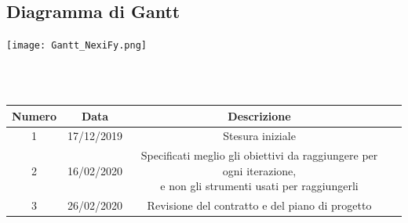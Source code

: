 \subsection{Diagramma di Gantt}
\vspace{0.5cm}
\begin{center}
	\hspace*{-2cm}\texttt{[image: Gantt\_NexiFy.png]}
\end{center}
\vspace{2cm}

\clearpage
{} \\ \\
\begin{tabular}{|c | c | c | c|} 
 	\hline
	 Numero & Data & Descrizione \\ [0.5ex] 
	\hline\hline
	1 & 17/12/2019 & Stesura iniziale \\ 
	\hline
	2 & 16/02/2020 & \thead{Specificati meglio gli obiettivi da raggiungere per ogni iterazione,\\e non gli strumenti usati per raggiungerli} \\ 
	\hline
	3 & 26/02/2020 & Revisione del contratto e del piano di progetto \\ 
	\hline
\end{tabular}